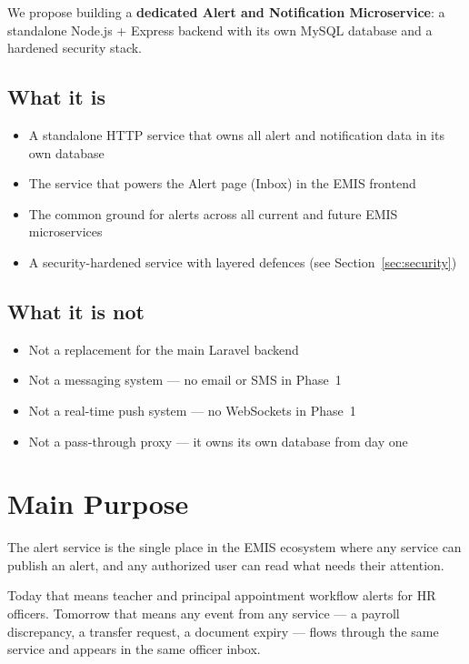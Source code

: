 \documentclass[11pt]{article}
\begin{document}
We propose building a \textbf{dedicated Alert and Notification Microservice}: a standalone
Node.js + Express backend with its own MySQL database and a hardened security stack.

\subsection{What it is}
\begin{itemize}
  \item A standalone HTTP service that owns all alert and notification data in its own database
  \item The service that powers the Alert page (Inbox) in the EMIS frontend
  \item The common ground for alerts across all current and future EMIS microservices
  \item A security-hardened service with layered defences (see Section~\ref{sec:security})
\end{itemize}

\subsection{What it is not}
\begin{itemize}
  \item Not a replacement for the main Laravel backend
  \item Not a messaging system --- no email or SMS in Phase~1
  \item Not a real-time push system --- no WebSockets in Phase~1
  \item Not a pass-through proxy --- it owns its own database from day one
\end{itemize}

\section{Main Purpose}

\begin{keybox}
The alert service is the single place in the EMIS ecosystem where any service can publish
an alert, and any authorized user can read what needs their attention.
\end{keybox}

Today that means teacher and principal appointment workflow alerts for HR officers.
Tomorrow that means any event from any service --- a payroll discrepancy, a transfer
request, a document expiry --- flows through the same service and appears in the same
officer inbox.
\end{document}
